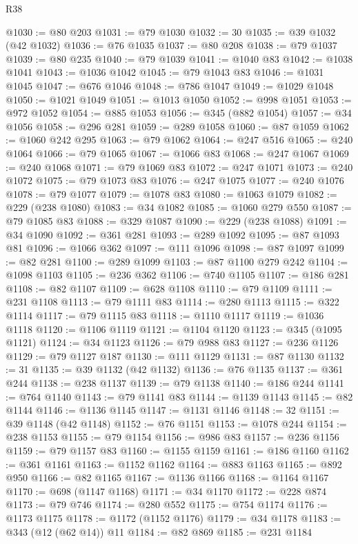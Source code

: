 \begin{lexlean}{R38}
\begin{coremodule}
@1030 := @80 @203
@1031 := @79 @1030
@1032 := 30
@1035 := @39 @1032 (@42 @1032)
@1036 := @76 @1035
@1037 := @80 @208
@1038 := @79 @1037
@1039 := @80 @235
@1040 := @79 @1039
@1041 := @1040 @83
@1042 := @1038 @1041
@1043 := @1036 @1042
@1045 := @79 @1043 @83
@1046 := @1031 @1045
@1047 := @676 @1046
@1048 := @786 @1047
@1049 := @1029 @1048
@1050 := @1021 @1049
@1051 := @1013 @1050
@1052 := @998 @1051
@1053 := @972 @1052
@1054 := @885 @1053
@1056 := @345 (@882 @1054)
@1057 := @34 @1056
@1058 := @296 @281
@1059 := @289 @1058
@1060 := @87 @1059
@1062 := @1060 @242 @295
@1063 := @79 @1062
@1064 := @247 @516
@1065 := @240 @1064
@1066 := @79 @1065
@1067 := @1066 @83
@1068 := @247 @1067
@1069 := @240 @1068
@1071 := @79 @1069 @83
@1072 := @247 @1071
@1073 := @240 @1072
@1075 := @79 @1073 @83
@1076 := @247 @1075
@1077 := @240 @1076
@1078 := @79 @1077
@1079 := @1078 @83
@1080 := @1063 @1079
@1082 := @229 (@238 @1080)
@1083 := @34 @1082
@1085 := @1060 @279 @550
@1087 := @79 @1085 @83
@1088 := @329 @1087
@1090 := @229 (@238 @1088)
@1091 := @34 @1090
@1092 := @361 @281
@1093 := @289 @1092
@1095 := @87 @1093 @81
@1096 := @1066 @362
@1097 := @111 @1096
@1098 := @87 @1097
@1099 := @82 @281
@1100 := @289 @1099
@1103 := @87 @1100 @279 @242
@1104 := @1098 @1103
@1105 := @236 @362
@1106 := @740 @1105
@1107 := @186 @281
@1108 := @82 @1107
@1109 := @628 @1108
@1110 := @79 @1109
@1111 := @231 @1108
@1113 := @79 @1111 @83
@1114 := @280 @1113
@1115 := @322 @1114
@1117 := @79 @1115 @83
@1118 := @1110 @1117
@1119 := @1036 @1118
@1120 := @1106 @1119
@1121 := @1104 @1120
@1123 := @345 (@1095 @1121)
@1124 := @34 @1123
@1126 := @79 @988 @83
@1127 := @236 @1126
@1129 := @79 @1127 @187
@1130 := @111 @1129
@1131 := @87 @1130
@1132 := 31
@1135 := @39 @1132 (@42 @1132)
@1136 := @76 @1135
@1137 := @361 @244
@1138 := @238 @1137
@1139 := @79 @1138
@1140 := @186 @244
@1141 := @764 @1140
@1143 := @79 @1141 @83
@1144 := @1139 @1143
@1145 := @82 @1144
@1146 := @1136 @1145
@1147 := @1131 @1146
@1148 := 32
@1151 := @39 @1148 (@42 @1148)
@1152 := @76 @1151
@1153 := @1078 @244
@1154 := @238 @1153
@1155 := @79 @1154
@1156 := @986 @83
@1157 := @236 @1156
@1159 := @79 @1157 @83
@1160 := @1155 @1159
@1161 := @186 @1160
@1162 := @361 @1161
@1163 := @1152 @1162
@1164 := @883 @1163
@1165 := @892 @950
@1166 := @82 @1165
@1167 := @1136 @1166
@1168 := @1164 @1167
@1170 := @698 (@1147 @1168)
@1171 := @34 @1170
@1172 := @228 @874
@1173 := @79 @746
@1174 := @280 @552
@1175 := @754 @1174
@1176 := @1173 @1175
@1178 := @1172 (@1152 @1176)
@1179 := @34 @1178
@1183 := @343 (@12 (@62 @14)) @11
@1184 := @82 @869
@1185 := @231 @1184

\end{coremodule}
\end{lexlean}
